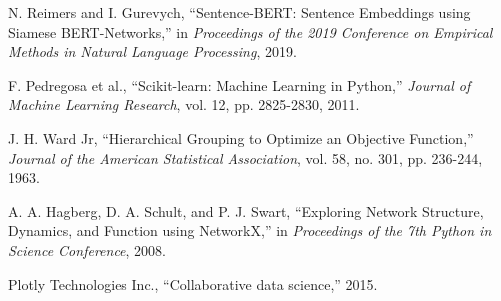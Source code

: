\documentclass[conference]{IEEEtran}
\begin{document}
\begin{thebibliography}{5}
 N. Reimers and I. Gurevych, ``Sentence-BERT: Sentence Embeddings using Siamese BERT-Networks,'' in \textit{Proceedings of the 2019 Conference on Empirical Methods in Natural Language Processing}, 2019.

 F. Pedregosa et al., ``Scikit-learn: Machine Learning in Python,'' \textit{Journal of Machine Learning Research}, vol. 12, pp. 2825-2830, 2011.

 J. H. Ward Jr, ``Hierarchical Grouping to Optimize an Objective Function,'' \textit{Journal of the American Statistical Association}, vol. 58, no. 301, pp. 236-244, 1963.

 A. A. Hagberg, D. A. Schult, and P. J. Swart, ``Exploring Network Structure, Dynamics, and Function using NetworkX,'' in \textit{Proceedings of the 7th Python in Science Conference}, 2008.

 Plotly Technologies Inc., ``Collaborative data science,'' 2015.
\end{thebibliography}
\end{document}
